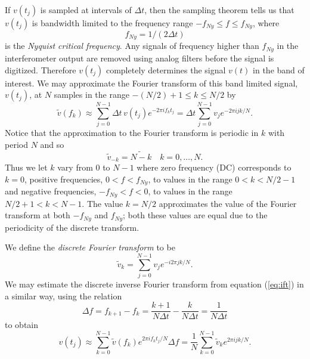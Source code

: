 If $v(t_j)$ is sampled at intervals of $\Delta t$, then the sampling
theorem\cite{Press:1992} tells us that $v(t_j)$ is bandwidth limited to the
frequency range $-f_{Ny} \le f \le f_{Ny}$, where
\begin{equation}
f_{Ny} = 1/(2\Delta t)
\end{equation}
is the \emph{Nyquist critical frequency}. Any signals of frequency higher than
$f_{Ny}$ in the interferometer output are removed using analog filters before
the signal is digitized. Therefore $v(t_j)$ completely determines the signal
$v(t)$ in the band of interest. We may approximate the Fourier transform of
this band limited signal, $v(t_j)$, at $N$ samples in the range 
$-(N/2)+1 \le k \le N/2$ by
\begin{equation}
\tilde{v}(f_k) \approx \sum_{j=0}^{N-1} \Delta t\, v(t_j) e^{-2 \pi i f_k t_j}
= \Delta t \sum_{j=0}^{N-1} v_j e^{-2 \pi i j k / N}.
\label{eq:fftapprox}
\end{equation}
Notice that the approximation to the Fourier transform is periodic in $k$ with
period $N$ and so 
\begin{equation}
\tilde{v}_{-k} = \tilde{N-k}\quad k = 0, \ldots, N.
\end{equation}
Thus we let $k$ vary from $0$ to $N-1$ where zero frequency (DC) corresponds
to $k=0$, positive frequencies, $0 < f < f_{Ny}$, to values in the range $0 <
k < N/2-1$ and negative frequencies, $-f_{Ny} < f < 0$, to values in the range $N/2+1 <
k < N-1$. The value $k = N/2$ approximates the value of the Fourier
transform at both $-f_{Ny}$ and $f_{Ny}$; both these values are equal due to
the periodicity of the discrete transform.

We define the \emph{discrete Fourier transform} to be\cite{Anderson:2001a}
\begin{equation}
\tilde{v}_k = \sum_{j=0}^{N-1} v_j e^{-i 2 \pi j k / N}.
\label{eq:dftdef}
\end{equation}
We may estimate the discrete inverse Fourier transform from equation
(\ref{eq:ift}) in a similar way, using the relation
\begin{equation}
\Delta f = f_{k+1} - f_k = \frac{k+1}{N\Delta t} - \frac{k}{N\Delta t} =
\frac{1}{N\Delta t}
\end{equation}
to obtain
\begin{equation}
v(t_j) \approx \sum_{k=0}^{N-1} \tilde{v}(f_k) e^{2 \pi i f_k t_j / N} \Delta f
= \frac{1}{N} \sum_{k=0}^{N-1} \tilde{v}_k e^{2 \pi i j k / N}.
\end{equation}

